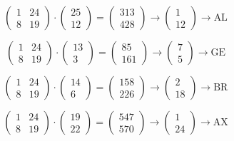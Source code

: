 \documentclass[a4paper,12pt,twocolumn]{article}
\begin{document}
\begin{equation}
\begin{pmatrix} 1 & 24 \\ 8 & 19 \end{pmatrix} \cdot \begin{pmatrix} 25 \\ 12 \end{pmatrix} = \begin{pmatrix} 313 \\ 428 \end{pmatrix} \rightarrow \begin{pmatrix} 1 \\ 12 \end{pmatrix} \rightarrow \text{AL}
\end{equation}

\begin{equation}
\begin{pmatrix} 1 & 24 \\ 8 & 19 \end{pmatrix} \cdot \begin{pmatrix} 13 \\ 3 \end{pmatrix} = \begin{pmatrix} 85 \\ 161 \end{pmatrix} \rightarrow \begin{pmatrix} 7 \\ 5 \end{pmatrix} \rightarrow \text{GE}
\end{equation}

\begin{equation}
\begin{pmatrix} 1 & 24 \\ 8 & 19 \end{pmatrix} \cdot \begin{pmatrix} 14 \\ 6 \end{pmatrix} = \begin{pmatrix} 158 \\ 226 \end{pmatrix} \rightarrow \begin{pmatrix} 2 \\ 18 \end{pmatrix} \rightarrow \text{BR}
\end{equation}

\begin{equation}
\begin{pmatrix} 1 & 24 \\ 8 & 19 \end{pmatrix} \cdot \begin{pmatrix} 19 \\ 22 \end{pmatrix} = \begin{pmatrix} 547 \\ 570 \end{pmatrix} \rightarrow \begin{pmatrix} 1 \\ 24 \end{pmatrix} \rightarrow \text{AX}
\end{equation}
\end{document}
